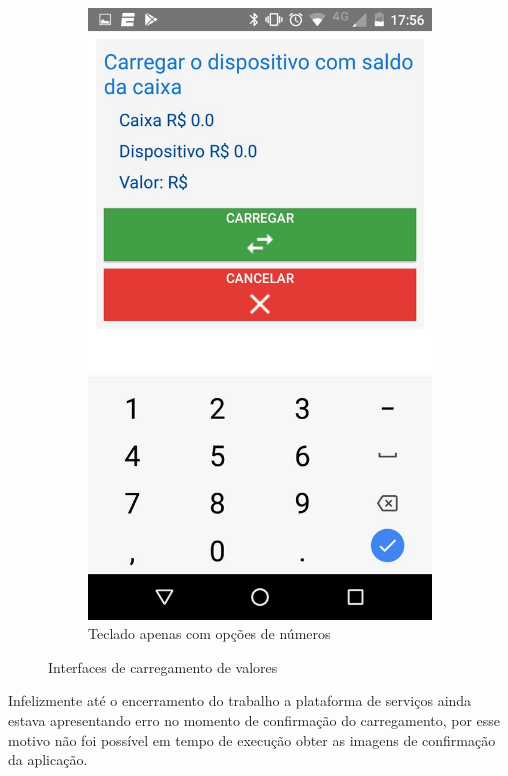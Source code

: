 \documentclass[hidelinks,12pt]{article}
\begin{document}
\begin{figure}[H]
\begin{subfigure}{0.5\textwidth}
		\includegraphics[scale=0.3]{charge}
		\caption{Teclado apenas com op\c{c}\~oes de números}
		\label{charge_numbers}
	\end{subfigure}
	\caption{Interfaces de carregamento de valores}
	\label{charge_s}
\end{figure}

Infelizmente at\'e o encerramento do trabalho a plataforma de servi\c{c}os ainda estava apresentando erro no momento de confirma\c{c}\~ao do carregamento, por esse motivo n\~ao foi poss\'ivel em tempo de execu\c{c}\~ao obter as imagens de confirma\c{c}\~ao da aplica\c{c}\~ao.
\end{document}
